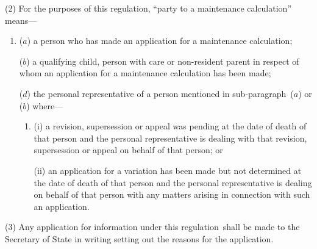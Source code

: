\documentclass[12pt,a4paper]{article}
\begin{document}
(2) For the purposes of this regulation, “party to a maintenance calculation” means—
\begin{enumerate}\item[]
($a$) a person who has made an application for a maintenance calculation;

($b$) a qualifying child, person with care or non-resident parent in respect of whom an application for a maintenance calculation has been made;



($d$) the personal representative of a person mentioned in sub-\hspace{0pt}paragraph~($a$)  or ($b$)  where—
\begin{enumerate}\item[]
(i) a revision, supersession or appeal was pending at the date of death of that person and the personal representative is dealing with that revision, supersession or appeal on behalf of that person; or

(ii) an application for a variation has been made but not determined at the date of death of that person and the personal representative is dealing on behalf of that person with any matters arising in connection with such an application.
\end{enumerate}
\end{enumerate}

(3) Any application for information under this regulation~shall be made to the 
Secretary of State  %
in writing setting out the reasons for the application.
\end{document}
